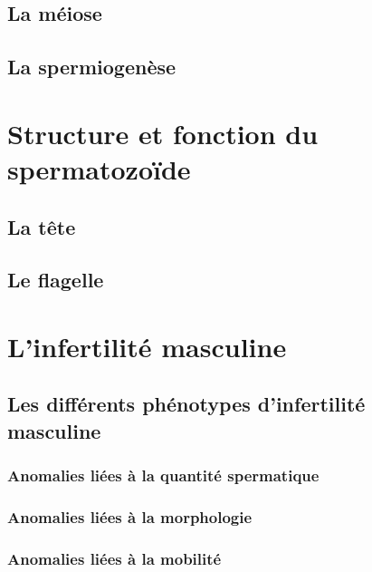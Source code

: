 \documentclass[12pt,a4paper,twoside]{ugathesis}
\begin{document}
\subsection{La méiose}\label{meiose}

\subsection{La spermiogenèse}\label{spermiogenese}

\section{Structure et fonction du
spermatozoïde}\label{structure-et-fonction-du-spermatozoide}

\subsection{La tête}\label{la-tete}

\subsection{Le flagelle}\label{le-flagelle}

\section{L'infertilité masculine}\label{linfertilite-masculine}

\subsection{Les différents phénotypes d'infertilité
masculine}\label{les-differents-phenotypes-dinfertilite-masculine}

\subsubsection{Anomalies liées à la quantité
spermatique}\label{infquant}

\subsubsection{Anomalies liées à la
morphologie}\label{anomalies-liees-a-la-morphologie}

\subsubsection{Anomalies liées à la
mobilité}\label{anomalies-liees-a-la-mobilite}
\end{document}
